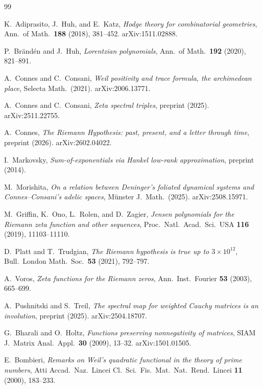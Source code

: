 \documentclass[11pt,a4paper]{article}
\begin{document}
\begin{thebibliography}{99}

K.~Adiprasito, J.~Huh, and E.~Katz,
\emph{Hodge theory for combinatorial geometries},
Ann.\ of Math.\ \textbf{188} (2018), 381--452.
arXiv:1511.02888.

P.~Br\"and\'en and J.~Huh,
\emph{Lorentzian polynomials},
Ann.\ of Math.\ \textbf{192} (2020), 821--891.

A.~Connes and C.~Consani,
\emph{Weil positivity and trace formula, the archimedean place},
Selecta Math.\ (2021).
arXiv:2006.13771.

A.~Connes and C.~Consani,
\emph{Zeta spectral triples},
preprint (2025).
arXiv:2511.22755.

A.~Connes,
\emph{The Riemann Hypothesis: past, present, and a letter through time},
preprint (2026).
arXiv:2602.04022.

I.~Markovsky,
\emph{Sum-of-exponentials via Hankel low-rank approximation},
preprint (2014).

M.~Morishita,
\emph{On a relation between Deninger's foliated dynamical systems and Connes--Consani's adelic spaces},
M\"unster J.\ Math.\ (2025).
arXiv:2508.15971.

M.~Griffin, K.~Ono, L.~Rolen, and D.~Zagier,
\emph{Jensen polynomials for the Riemann zeta function and other sequences},
Proc.\ Natl.\ Acad.\ Sci.\ USA \textbf{116} (2019), 11103--11110.

D.~Platt and T.~Trudgian,
\emph{The Riemann hypothesis is true up to $3 \times 10^{12}$},
Bull.\ London Math.\ Soc.\ \textbf{53} (2021), 792--797.

A.~Voros,
\emph{Zeta functions for the Riemann zeros},
Ann.\ Inst.\ Fourier \textbf{53} (2003), 665--699.

A.~Pushnitski and S.~Treil,
\emph{The spectral map for weighted Cauchy matrices is an involution},
preprint (2025).
arXiv:2504.18707.

G.~Bharali and O.~Holtz,
\emph{Functions preserving nonnegativity of matrices},
SIAM J.\ Matrix Anal.\ Appl.\ \textbf{30} (2009), 13--32.
arXiv:1501.01505.

E.~Bombieri,
\emph{Remarks on Weil's quadratic functional in the theory of prime numbers},
Atti Accad.\ Naz.\ Lincei Cl.\ Sci.\ Fis.\ Mat.\ Nat.\ Rend.\ Lincei \textbf{11} (2000), 183--233.


\end{thebibliography}
\end{document}
